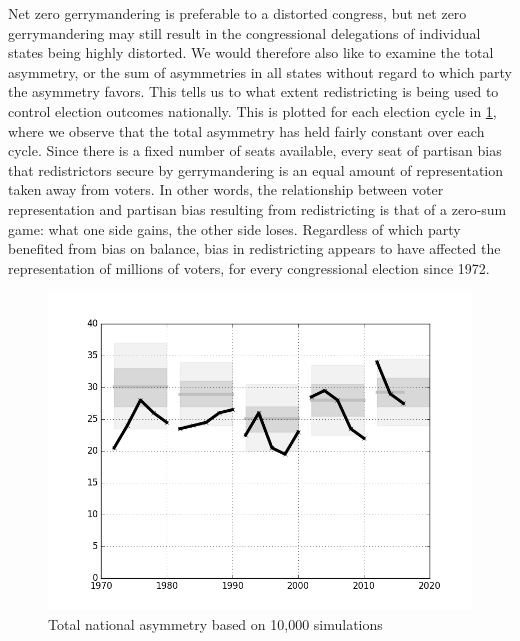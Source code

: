 \documentclass[preprint,12pt]{article}
\begin{document}
Net zero gerrymandering is preferable to a distorted congress, but net zero gerrymandering may still result in the congressional delegations of individual states being highly distorted.
We would therefore also like to examine the total asymmetry, or the sum of asymmetries in all states without regard to which party the asymmetry favors.
This tells us to what extent redistricting is being used to control election outcomes nationally.
This is plotted for each election cycle in \ref{fig:totalAsym}, where we observe that the total asymmetry has held fairly constant over each cycle.
Since there is a fixed number of seats available, every seat of partisan bias that redistrictors secure by gerrymandering is an equal amount of representation taken away from voters.
In other words, the relationship between voter representation and partisan bias resulting from redistricting is that of a zero-sum game: what one side gains, the other side loses.
Regardless of which party benefited from bias on balance, bias in redistricting appears to have affected the representation of millions of voters, for every congressional election since 1972.
\begin{figure}[htb!]
    \begin{center}
        \includegraphics[scale=0.8]{../Figures/ExpectedAsymmetry/totalAsym.png}
        \caption{Total national asymmetry based on 10,000 simulations}\label{fig:totalAsym}
    \end{center}
\end{figure}
\end{document}
